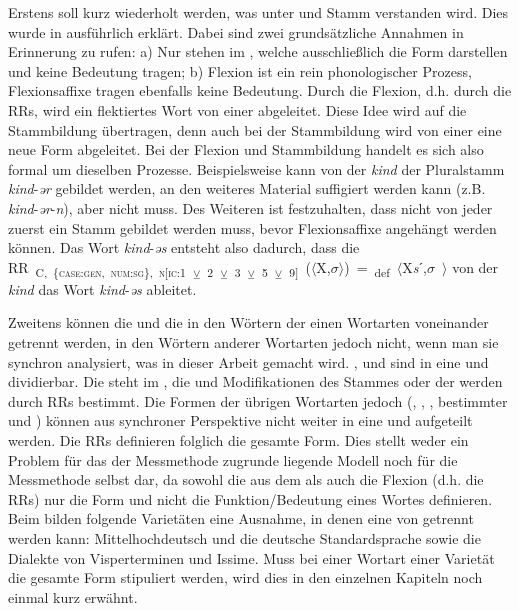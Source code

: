 Erstens soll kurz wiederholt werden, was unter  und Stamm verstanden wird. Dies wurde in  ausführlich erklärt. Dabei sind zwei grundsätzliche Annahmen in Erinnerung zu rufen: a) Nur  stehen im , welche ausschließlich die Form darstellen und keine Bedeutung tragen; b) Flexion ist ein rein phonologischer Prozess, Flexionsaffixe tragen ebenfalls keine Bedeutung. Durch die Flexion, d.h. durch die RRs, wird ein flektiertes Wort von einer  abgeleitet. Diese Idee wird auf die Stammbildung übertragen, denn auch bei der Stammbildung wird von einer  eine neue Form abgeleitet. Bei der Flexion und Stammbildung handelt es sich also formal um dieselben Prozesse. Beispielsweise kann von der  \textit{kind} der Pluralstamm \textit{kind}-\textit{ər} gebildet werden, an den weiteres Material suffigiert werden kann (z.B. \textit{kind}-\textit{ər}-\textit{n}), aber nicht muss. Des Weiteren ist festzuhalten, dass nicht von jeder  zuerst ein Stamm gebildet werden muss, bevor Flexionsaffixe angehängt werden können. Das Wort \textit{kind}-\textit{əs} entsteht also dadurch, dass die  \mbox{RR \textsubscript{C, \{\textsc{case:gen}, \textsc{num:sg}\}, \textsc{n[}\textsc{ic:}1} \textsubscript{${\veebar}$}\textsubscript{ 2} \textsubscript{${\veebar}$}\textsubscript{ 3} \textsubscript{${\veebar}$}\textsubscript{ 5} \textsubscript{${\veebar}$}\textsubscript{ 9]} ($\langle$X,$\sigma$$\rangle$) = \textsubscript{def} $\langle$X\textit{s}ˊ,$\sigma$ $\rangle$} von der  \textit{kind} das Wort \textit{kind}-\textit{əs} ableitet.

Zweitens können die  und die  in den Wörtern der einen Wortarten voneinander getrennt werden, in den Wörtern anderer Wortarten jedoch nicht, wenn man sie synchron analysiert, was in dieser Arbeit gemacht wird. ,  und  sind in eine  und  dividierbar. Die  steht im , die  und Modifikationen des Stammes oder der  werden durch RRs bestimmt. Die Formen der übrigen Wortarten jedoch (, , , bestimmter und ) können aus synchroner Perspektive nicht weiter in eine  und  aufgeteilt werden. Die RRs definieren folglich die gesamte Form. Dies stellt weder ein Problem für das der Messmethode zugrunde liegende Modell noch für die Messmethode selbst dar, da sowohl die  aus dem  als auch die Flexion (d.h. die RRs) nur die Form und nicht die Funktion/Bedeutung eines Wortes definieren. Beim  bilden folgende Varietäten eine Ausnahme, in denen eine  von  getrennt werden kann: Mittelhochdeutsch und die deutsche Standardsprache sowie die Dialekte von Visperterminen und Issime. Muss bei einer Wortart einer Varietät die gesamte Form stipuliert werden, wird dies in den einzelnen Kapiteln noch einmal kurz erwähnt.

